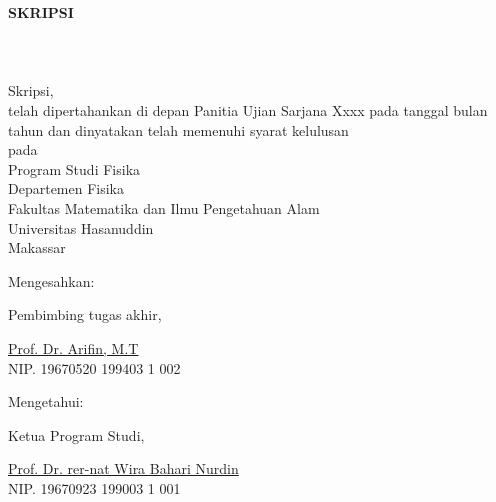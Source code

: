 
\begingroup
\singlespacing
\fontsize{11pt}{13pt}\selectfont
\begin{center}
  \textbf{SKRIPSI} \\
  \vfill
  \textbf{\JudulSkripsi} \\
  \vfill
  \textbf{\underline{\NamaPenulis}} \\
  \textbf{\NIM} \\
  \vfill
  \begingroup
  \fontsize{10pt}{13pt}\selectfont
  Skripsi, \\
  \vfill
  telah dipertahankan di depan Panitia Ujian Sarjana Xxxx pada
  tanggal bulan tahun dan dinyatakan telah memenuhi syarat kelulusan \\
  pada \\
  \vfill
  Program Studi Fisika \\
  Departemen Fisika \\
  Fakultas Matematika dan Ilmu Pengetahuan Alam \\
  Universitas Hasanuddin \\
  Makassar \\
  \vfill
  \noindent
  \begin{minipage}[t]{0.38\textwidth}
    Mengesahkan:\par
    Pembimbing tugas akhir,\par\vspace{2cm}

    \underline{Prof. Dr. Arifin, M.T}\\
    NIP. 19670520 199403 1 002
  \end{minipage}
  \hfill
  \begin{minipage}[t]{0.38\textwidth}
    Mengetahui:\par
    Ketua Program Studi,\par\vspace{2cm}

    \underline{Prof. Dr. rer-nat Wira Bahari Nurdin}\\
    NIP. 19670923 199003 1 001
  \end{minipage}
  \endgroup
\end{center}

\endgroup
\restoregeometry
\clearpage
{}

